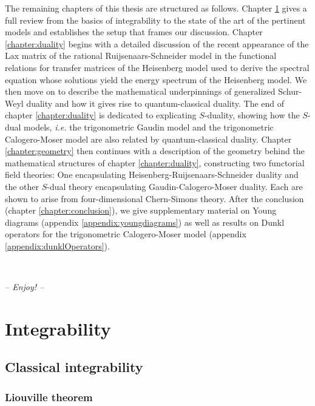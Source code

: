 \documentclass[11pt]{report}
\theoremstyle{definition}
\theoremstyle{remark}
\theoremstyle{remark}
\begin{document}
The remaining chapters of this thesis are structured as follows. Chapter \ref{chapter:integrability} gives a full review from the basics of integrability to the state of the art of the pertinent models and establishes the setup that frames our discussion. Chapter \ref{chapter:duality} begins with a detailed discussion of the recent appearance of the Lax matrix of the rational Ruijsenaars-Schneider model in the functional relations for transfer matrices of the Heisenberg model used to derive the spectral equation whose solutions yield the energy spectrum of the Heisenberg model. We then move on to describe the mathematical underpinnings of generalized Schur-Weyl duality and how it gives rise to quantum-classical duality. The end of chapter \ref{chapter:duality} is dedicated to explicating $S$-duality, showing how the $S$-dual models, \emph{i.e.} the trigonometric Gaudin model and the trigonometric Calogero-Moser model are also related by quantum-classical duality. Chapter \ref{chapter:geometry} then continues with a description of the geometry behind the mathematical structures of chapter \ref{chapter:duality}, constructing two functorial field theories: One encapsulating Heisenberg-Ruijsenaars-Schneider duality and the other $S$-dual theory encapsulating Gaudin-Calogero-Moser duality. Each are shown to arise from four-dimensional Chern-Simons theory. After the conclusion (chapter \ref{chapter:conclusion}), we give supplementary material on Young diagrams (appendix \ref{appendix:youngdiagrams}) as well as results on Dunkl operators for the trigonometric Calogero-Moser model (appendix \ref{appendix:dunklOperators}).

~\\

\begin{center}
\textit{-- Enjoy! --}
\end{center}


\chapter{Integrability}\label{chapter:integrability}

\section{Classical integrability}

\subsection{Liouville theorem}
\end{document}

